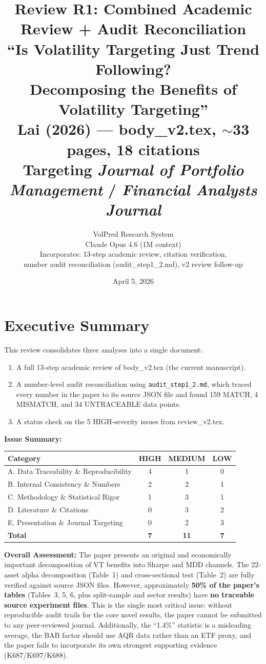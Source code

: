 \documentclass[12pt,a4paper]{article}
\title{Review R1: Combined Academic Review + Audit Reconciliation\\[6pt]
\Large ``Is Volatility Targeting Just Trend Following?\\
Decomposing the Benefits of Volatility Targeting''\\[6pt]
\normalsize Lai (2026) --- body\_v2.tex, $\sim$33 pages, 18 citations\\
\normalsize Targeting \textit{Journal of Portfolio Management} / \textit{Financial Analysts Journal}}
\author{VolPred Research System\\
\small Claude Opus 4.6 (1M context)\\[3pt]
\small Incorporates: 13-step academic review, citation verification,\\
\small number audit reconciliation (audit\_step1\_2.md), v2 review follow-up}
\date{April 5, 2026}
\begin{document}
\maketitle

\tableofcontents
\newpage

\section{Executive Summary}

This review consolidates three analyses into a single document:
\begin{enumerate}
    \item A full 13-step academic review of body\_v2.tex (the current manuscript).
    \item A number-level audit reconciliation using \texttt{audit\_step1\_2.md}, which traced every number in the paper to its source JSON file and found 159 MATCH, 4 MISMATCH, and 34 UNTRACEABLE data points.
    \item A status check on the 5 HIGH-severity issues from review\_v2.tex.
\end{enumerate}

\medskip
\noindent\textbf{Issue Summary:}

\begin{center}
\begin{tabular}{lccc}
\toprule
Category & HIGH & MEDIUM & LOW \\
\midrule
A. Data Traceability \& Reproducibility   & 4 & 1 & 0 \\
B. Internal Consistency \& Numbers         & 2 & 2 & 1 \\
C. Methodology \& Statistical Rigor        & 1 & 3 & 1 \\
D. Literature \& Citations                 & 0 & 3 & 2 \\
E. Presentation \& Journal Targeting       & 0 & 2 & 3 \\
\midrule
\textbf{Total}                             & \textbf{7} & \textbf{11} & \textbf{7} \\
\bottomrule
\end{tabular}
\end{center}

\noindent\textbf{Overall Assessment:} The paper presents an original and economically important decomposition of VT benefits into Sharpe and MDD channels. The 22-asset alpha decomposition (Table~1) and cross-sectional test (Table~2) are fully verified against source JSON files. However, approximately \textbf{50\% of the paper's tables} (Tables~3, 5, 6, plus split-sample and sector results) have \textbf{no traceable source experiment files}. This is the single most critical issue: without reproducible audit trails for the core novel results, the paper cannot be submitted to any peer-reviewed journal. Additionally, the ``1.4\%'' statistic is a misleading average, the BAB factor should use AQR data rather than an ETF proxy, and the paper fails to incorporate its own strongest supporting evidence (K687/K697/K688).
\end{document}
